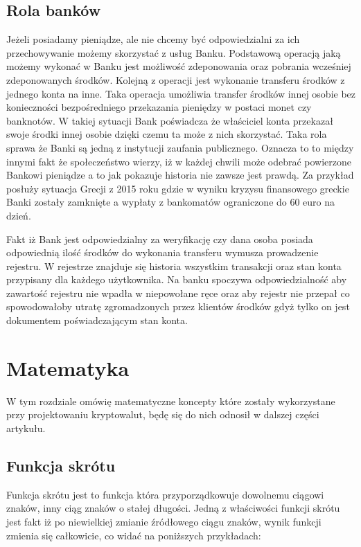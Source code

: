 \documentclass[journal,12pt,onecolumn,draftclsnofoot,]{IEEEtran}
\begin{document}
\subsection{Rola banków}

Jeżeli posiadamy pieniądze, ale nie chcemy być odpowiedzialni za ich przechowywanie możemy skorzystać z usług Banku.
Podstawową operacją jaką możemy wykonać w Banku jest możliwość zdeponowania oraz pobrania wcześniej zdeponowanych
środków. Kolejną z operacji jest wykonanie transferu środków z jednego konta na inne. Taka operacja umożliwia transfer
środków innej osobie bez konieczności bezpośredniego przekazania pieniędzy w postaci monet czy banknotów. W takiej
sytuacji Bank poświadcza że właściciel konta przekazał swoje środki innej osobie dzięki czemu ta może z nich skorzystać.
Taka rola sprawa że Banki są jedną z instytucji zaufania publicznego. Oznacza to to między innymi fakt że społeczeństwo
wierzy, iż w każdej chwili może odebrać powierzone Bankowi pieniądze a to jak pokazuje historia nie zawsze jest prawdą.
Za przykład posłuży sytuacja Grecji z 2015 roku gdzie w wyniku kryzysu finansowego greckie Banki zostały zamknięte a
wypłaty z bankomatów ograniczone do 60 euro na dzień.\cite{kryzysGrecji}

Fakt iż Bank jest odpowiedzialny za weryfikację czy dana osoba posiada odpowiednią ilość środków do wykonania transferu
wymusza prowadzenie rejestru. W rejestrze znajduje się historia wszystkim transakcji oraz stan konta przypisany dla
każdego użytkownika. Na banku spoczywa odpowiedzialność aby zawartość rejestru nie wpadła w niepowołane ręce oraz aby
rejestr nie przepał co spowodowałoby utratę zgromadzonych przez klientów środków gdyż tylko on jest dokumentem
poświadczającym stan konta.

\section{Matematyka}

W tym rozdziale omówię matematyczne koncepty które zostały wykorzystane przy projektowaniu kryptowalut, będę się do nich
odnosił w  dalszej części artykułu.

\subsection{Funkcja skrótu}

Funkcja skrótu jest to funkcja która przyporządkowuje dowolnemu ciągowi znaków, inny ciąg znaków o stałej długości.
Jedną z właściwości funkcji skrótu jest fakt iż po niewielkiej zmianie źródłowego ciągu znaków, wynik funkcji zmienia się
całkowicie, co widać na poniższych przykładach:
\end{document}
